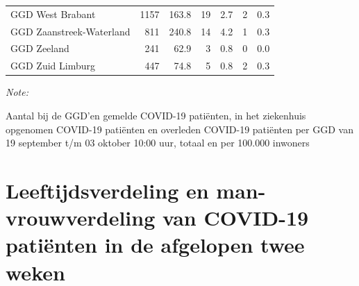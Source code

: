\documentclass[
  english,
  man,floatsintext]{apa6}
\begin{document}
\begin{table}[H]
\begin{threeparttable}
\begin{tabular}{lrrrrrr}
GGD West Brabant & 1157 & 163.8 & 19 & 2.7 & 2 & 0.3\\
GGD Zaanstreek-Waterland & 811 & 240.8 & 14 & 4.2 & 1 & 0.3\\
GGD Zeeland & 241 & 62.9 & 3 & 0.8 & 0 & 0.0\\
GGD Zuid Limburg & 447 & 74.8 & 5 & 0.8 & 2 & 0.3\\
\bottomrule
\end{tabular}
\begin{tablenotes}
\item \textit{Note: } 
\item Aantal bij de GGD’en gemelde COVID-19 patiënten, in het ziekenhuis opgenomen COVID-19 patiënten en overleden COVID-19 patiënten per GGD van 19 september t/m 03 oktober 10:00 uur, totaal en per 100.000 inwoners
\end{tablenotes}
\end{threeparttable}
\endgroup{}
\end{table}

\newpage

\hypertarget{leeftijdsverdeling-en-man-vrouwverdeling-van-covid-19-patiuxebnten-in-de-afgelopen-twee-weken}{%
\section{Leeftijdsverdeling en man-vrouwverdeling van COVID-19 patiënten in de afgelopen twee weken}\label{leeftijdsverdeling-en-man-vrouwverdeling-van-covid-19-patiuxebnten-in-de-afgelopen-twee-weken}}
\end{document}
